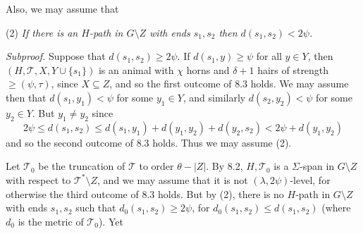 Also, we may assume that

\hspace*{12pt}(2) \textit{If there is an $H$-path in $G \setminus Z$ with ends $s_1, s_2$ then $d(s_1, s_2) < 2\psi$.}

\textit{Subproof.} Suppose that $d(s_1, s_2) \ge 2\psi$. If $d(s_1, y) \ge \psi$ for all $y \in Y$, then $(H, \mathcal{T}, X, Y \cup \{s_1\})$ is an animal with $\chi$ horns and $\delta + 1$ hairs of strength $\ge (\psi, \tau)$, since $X \subseteq Z$, and so the first outcome of 8.3 holds. We may assume then that $d(s_1, y_1) < \psi$ for some $y_1 \in Y$, and similarly $d(s_2, y_2) < \psi$ for some $y_2 \in Y$. But $y_1 \ne y_2$ since
\begin{equation*}
2\psi \le d(s_1, s_2) \le d(s_1, y_1) + d(y_1, y_2) + d(y_2, s_2) < 2\psi + d(y_1, y_2)
\end{equation*}
and so the second outcome of 8.3 holds. Thus we may assume (2).

Let $\mathcal{T}_0$ be the truncation of $\mathcal{T}$ to order $\theta - |Z|$. By 8.2, $H, \mathcal{T}_0$ is a $\Sigma$-span in $G \setminus Z$ with respect to $\mathcal{T}^* \setminus Z$, and we may assume that it is not $(\lambda, 2\psi)$-level, for otherwise the third outcome of 8.3 holds. But by (2), there is no $H$-path in $G \setminus Z$ with ends $s_1, s_2$ such that $d_0(s_1, s_2) \ge 2\psi$, for $d_0(s_1, s_2) \le d(s_1, s_2)$ (where $d_0$ is the metric of $\mathcal{T}_0$). Yet
